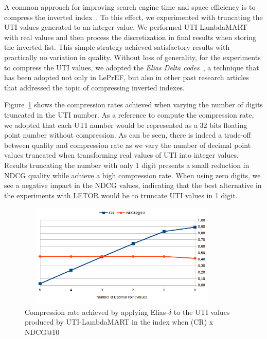 \documentclass[preprint,review,10pt,3p]{elsarticle}
\begin{document}
A common approach for improving search engine time and space efficiency is to compress the inverted index~\cite{baezaribeiro2011modinforet}. To this effect, we experimented with truncating the UTI values generated to an integer value. We performed UTI-LambdaMART with real values and then process the discretization in final results when storing  the inverted list. This simple strategy achieved satisfactory results with practically no variation in quality. Without loss of generality, for the experiments to compress the UTI values, we adopted the \textit{Elias Delta codes}~\cite{elias1975universal}, a technique that has been adopted not only in LePrEF, but also in other past research articles that addressed the topic of compressing inverted indexes.

 Figure~\ref{fig:crq} shows the compression rates achieved when varying the number of digits truncated in the UTI number. As a reference to compute the compression rate, we adopted that each UTI number would be represented as a 32 bits floating point number without compression. As can be seen,  there is indeed a trade-off between quality and compression rate as we vary the number of decimal point values truncated when transforming real values of UTI into integer values. Results truncating the number with only $1$ digit presents a small reduction in NDCG quality while achieve a high compression rate. When using zero digits, we see a negative impact in the NDCG values, indicating that the best alternative in the experiments with LETOR would be to truncate UTI values in 1 digit.

\begin{figure}[h!]
\begin{center}
\includegraphics[width=10cm, height=5cm]{im_cr_ndcg_lambda.png}
\caption{Compression rate achieved by applying Elias-$\delta$ to the UTI values produced by UTI-LambdaMART in the  index when (CR) x NDCG@10}
\label{fig:crq}
\end{center}
\end{figure}
\end{document}
